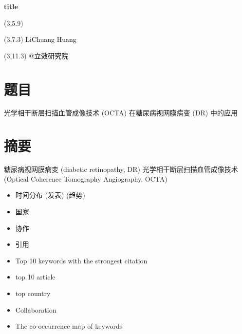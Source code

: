 \documentclass[
]{article}
\author{}
\date{\vspace{-2.5em}}
\providecommand{\tightlist}{%
  \setlength{\itemsep}{0pt}\setlength{\parskip}{0pt}}
\begin{document}
\begin{titlepage} 
\begin{center} \textbf{\Huge title} \vspace{4em}
\begin{textblock}{10}(3,5.9) \huge
\textbf{\textcolor{white}{2023-11-16}}
\end{textblock} \begin{textblock}{10}(3,7.3)
\Large \textcolor{black}{LiChuang Huang}
\end{textblock} \begin{textblock}{10}(3,11.3)
\Large \textcolor{black}{@立效研究院}
\end{textblock} \end{center} \end{titlepage}
\restoregeometry


\tableofcontents

\listoffigures

\listoftables

\newpage


\hypertarget{ux9898ux76ee}{%
\section{题目}\label{ux9898ux76ee}}

光学相干断层扫描血管成像技术 (OCTA) 在糖尿病视网膜病变 (DR) 中的应用

\hypertarget{abstract}{%
\section{摘要}\label{abstract}}

糖尿病视网膜病变 (diabetic retinopathy, DR)
光学相干断层扫描血管成像技术 (Optical Coherence Tomography Angiography, OCTA)

\begin{itemize}
\tightlist
\item
  时间分布 (发表) (趋势)
\item
  国家
\item
  协作
\item
  引用
\item
  Top 10 keywords with the strongest citation
\item
  top 10 article
\item
  top country
\item
  Collaboration
\item
  The co-occurrence map of keywords
\end{itemize}
\end{document}
